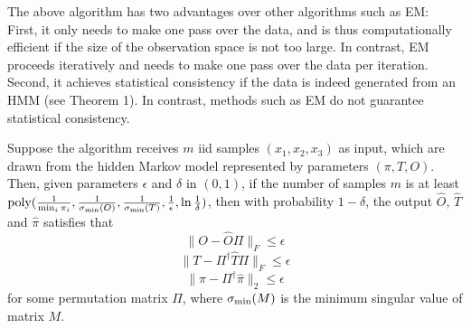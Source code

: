 The above algorithm has two advantages over other algorithms such as EM: First, it only needs to make one pass over the data, and is thus computationally efficient if the size of the observation space is not too large. In contrast, EM proceeds iteratively and needs to make one pass over the data per iteration. Second, it achieves statistical consistency if the data is indeed generated from an HMM (see Theorem 1). In contrast, methods such as EM do not guarantee statistical consistency.

\begin{theorem}
Suppose the algorithm receives $m$ iid samples $(x_1, x_2, x_3)$ as input, which are drawn from the hidden Markov model represented by parameters $(\pi, T, O)$. Then, given parameters $\epsilon$ and $\delta$ in $(0,1)$, if the number of samples $m$ is at least $\text{poly}( \frac{1}{\min_i \pi_i}, \frac{1}{\sigma_{\text{min}}(O)}, \frac{1}{\sigma_{\text{min}}(T)}, \frac{1}{\epsilon}, \ln \frac{1}{\delta})$,
then with probability $1-\delta$, the output $\hat{O}$, $\hat{T}$ and $\hat{\pi}$ satisfies that
\[ \| O - \hat{O} \Pi \|_F \leq \epsilon \]
\[ \| T - \Pi^\dagger \hat{T} \Pi \|_F \leq \epsilon \]
\[ \| \pi - \Pi^\dagger \hat  \pi \|_2 \leq \epsilon \]
for some permutation matrix $\Pi$, where $\sigma_{\text{min}}(M)$ is the minimum singular value of matrix $M$.
\end{theorem}
